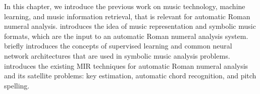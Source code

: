 

In this chapter, we introduce the previous work on music
technology, machine learning, and music information
retrieval, that is relevant for automatic Roman numeral
analysis.  introduces the idea
of music representation and symbolic music formats, which
are the input to an automatic Roman numeral analysis system.
 briefly introduces the concepts
of supervised learning and common neural network
architectures that are used in symbolic music analysis
problems.  introduces the
existing MIR techniques for automatic Roman numeral analysis
and its satellite problems: key estimation, automatic chord
recognition, and pitch spelling.

